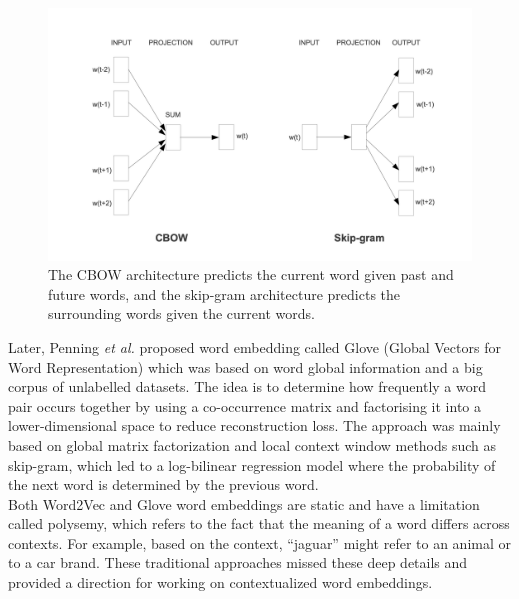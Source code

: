 \documentclass[%
	BCOR=8mm, %
	DIV=12,
	toc=bibliography, %
	toc=listof, %
	oneside, %
	egregdoesnotlikesansseriftitles, %
	]{scrbook}
\begin{document}
\begin{figure}[h!]
    \centering
    \includegraphics[width=0.7\linewidth]{img/cbowandskip.png}
    \caption[Working diagram of CBOW and Skip-gram.]{ The CBOW architecture predicts the current word given past and future words, and the skip-gram architecture predicts the surrounding words given the current words.}
    \label{fig:cbow}
\end{figure}
Later, Penning \textit{et al.} \cite{pennington_glove_2014} proposed word embedding called Glove (Global Vectors for Word Representation) which was based on word global information and a big corpus of unlabelled datasets. The idea is to determine how frequently a word pair occurs together by using a co-occurrence matrix and factorising it into a lower-dimensional space to reduce reconstruction loss. The approach was mainly based on global matrix factorization and local context window methods such as skip-gram, which led to a log-bilinear regression model where the probability of the next word is determined by the previous word.\\
 Both Word2Vec and Glove word embeddings are static and have a limitation called polysemy, which refers to the fact that the meaning of a word differs across contexts. For example, based on the context, ``jaguar'' might refer to an animal or to a car brand. These traditional approaches missed these deep details and provided a direction for working on contextualized word embeddings.
\end{document}
